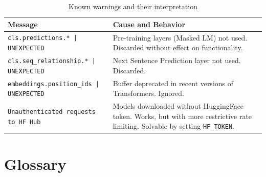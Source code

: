 \documentclass[12pt, a4paper]{report}
\begin{document}
\begin{table}[H]
\centering
\begin{tabular}{p{6cm} p{8cm}}
\toprule
\textbf{Message} & \textbf{Cause and Behavior} \\
\midrule
\texttt{cls.predictions.* | UNEXPECTED} &
Pre-training layers (Masked LM) not used. Discarded without
effect on functionality. \\[0.5em]
\texttt{cls.seq\_relationship.* | UNEXPECTED} &
Next Sentence Prediction layer not used. Discarded. \\[0.5em]
\texttt{embeddings.position\_ids | UNEXPECTED} &
Buffer deprecated in recent versions of Transformers. Ignored. \\[0.5em]
\texttt{Unauthenticated requests to HF Hub} &
Models downloaded without HuggingFace token. Works, but with
more restrictive rate limiting. Solvable by setting
\texttt{HF\_TOKEN}. \\
\bottomrule
\end{tabular}
\caption{Known warnings and their interpretation}
\end{table}

% 
\chapter{Glossary}
% 
\end{document}
